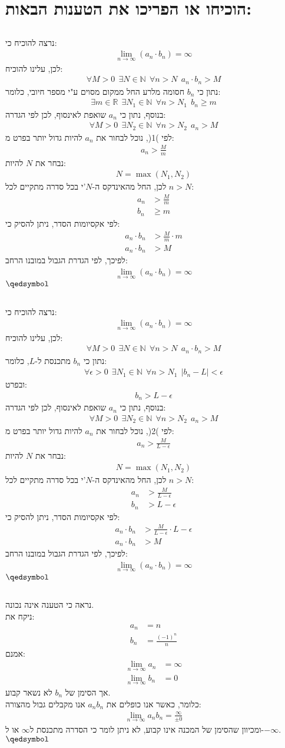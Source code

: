 \documentclass[a4paper, 12pt, leqno]{article}
\newcommand{\sub}[1]{\subsection{\underline{#1}}}
\newcommand{\N}{\ensuremath{\mathbb{N}}}
\newcommand{\eq}[1]{\begin{align*}#1\end{align*}}
\newcommand{\eqn}[1]{\begin{align}#1\end{align}}
\renewcommand{\qed}{\hfill\(\qedsymbol\)}
\renewcommand{\geq}{\geqslant}
\newcommand{\limn}{\lim_{n\to\infty}}
\begin{document}
\setcounter{equation}{0}
\section{הוכיחו או הפריכו את הטענות הבאות:}
\sub{}
נרצה להוכיח כי:
\eq{
    \limn(a_n\cdot{b_n})=\infty
}
לכן, עלינו להוכיח:
\eq{
    \forall{M>0}~~\exists{N\in\N}~~\forall{n>N}~~a_n\cdot{b_n}>M
}
נתון כי $b_n$ חסומה מלרע החל ממקום מסוים ע"י מספר חיובי, כלומר:
\eq{
    \exists{m\in\mathbb{R}}~~\exists{N_1\in\N}~~\forall{n>N_1}~~b_n\geq{m}
}
בנוסף, נתון כי $a_n$ שואפת לאינסוף, לכן לפי הגדרה:
\eqn{
    \forall{M>0}~~\exists{N_2\in\N}~~\forall{n>N_2}~~a_n>M
}
לפי )1(, נוכל לבחור את $a_n$ להיות גדול יותר בפרט מ:
\eq{
    a_n>\frac{M}{m}
}
נבחר את $N$ להיות:
\eq{
    N=\max(N_1,N_2)
}
לכן, החל מהאינדקס ה-$N$'י בכל סדרה מתקיים לכל $n>N$:
\eq{
    a_n&>\frac{M}{m}\\
    b_n&\geq{m}
}
לפי אקסיומות הסדר, ניתן להסיק כי:
\eq{
    a_n\cdot{b_n}&>\frac{M}{m}\cdot{m}\\
    a_n\cdot{b_n}&>M
}
לפיכך, לפי הגדרת הגבול במובנו הרחב:
\eq{
    \limn(a_n\cdot{b_n})=\infty
}
\qed\pagebreak
\setcounter{equation}{0}
\sub{}
נרצה להוכיח כי:
\eq{
    \limn(a_n\cdot{b_n})=\infty
}
לכן, עלינו להוכיח:
\eq{
    \forall{M>0}~~\exists{N\in\N}~~\forall{n>N}~~a_n\cdot{b_n}>M
}
נתון כי $b_n$ מתכנסת ל-$L$, כלומר:
\eq{
    \forall\epsilon>0~~\exists{N_1}\in\N~~\forall{n}>N_1~~|b_n-L|<\epsilon
}
ובפרט:
\eqn{
    b_n>L-\epsilon
}
בנוסף, נתון כי $a_n$ שואפת לאינסוף, לכן לפי הגדרה:
\eqn{
    \forall{M>0}~~\exists{N_2\in\N}~~\forall{n>N_2}~~a_n>M
}
לפי )2(, נוכל לבחור את $a_n$ להיות גדול יותר בפרט מ:
\eq{
    a_n>\frac{M}{L-\epsilon}
}
נבחר את $N$ להיות:
\eq{
    N=\max(N_1,N_2)
}
לכן, החל מהאינדקס ה-$N$'י בכל סדרה מתקיים לכל $n>N$:
\eq{
    a_n&>\frac{M}{L-\epsilon}\\
    b_n&>{L-\epsilon}
}
לפי אקסיומות הסדר, ניתן להסיק כי:
\eq{
    a_n\cdot{b_n}&>\frac{M}{L-\epsilon}\cdot{L-\epsilon}\\
    a_n\cdot{b_n}&>M
}
לפיכך, לפי הגדרת הגבול במובנו הרחב:
\eq{
    \limn(a_n\cdot{b_n})=\infty
}
\qed\pagebreak
\setcounter{equation}{0}
\sub{}
נראה כי הטענה אינה נכונה.\\
ניקח את:
\eq{
    a_n&=n\\
    b_n&=\frac{(-1)^n}{n}
}
אמנם:
\eq{
    \limn{a_n}&=\infty\\
    \limn{b_n}&=0
}
אך הסימן של $b_n$ לא נשאר קבוע.\\
כלומר, כאשר אנו כופלים את $a_nb_n$ אנו מקבלים גבול מהצורה:
\eq{
    \limn a_nb_n=\frac{\infty}{\pm0}
}
ומכיוון שהסימן של המכנה אינו קבוע, לא ניתן לומר כי הסדרה מתכנסת ל$\infty$ או ל-$-\infty$.
\qed
\end{document}
